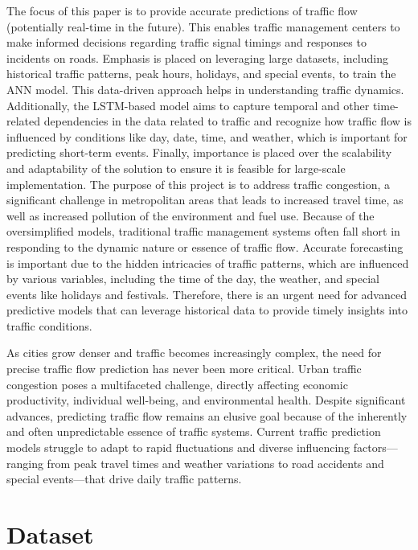 \documentclass[conference]{IEEEtran}
\begin{document}
The focus of this paper is to provide accurate predictions of traffic flow (potentially real-time in the future). This enables traffic management centers to make informed decisions regarding traffic signal timings and responses to incidents on roads. Emphasis is placed on leveraging large datasets, including historical traffic patterns, peak hours, holidays, and special events, to train the ANN model. This data-driven approach helps in understanding traffic dynamics. Additionally, the LSTM-based model aims to capture temporal and other time-related dependencies in the data related to traffic and recognize how traffic flow is influenced by conditions like day, date, time, and weather, which is important for predicting short-term events. Finally, importance is placed over the scalability and adaptability of the solution to ensure it is feasible for large-scale implementation. The purpose of this project is to address traffic congestion, a significant challenge in metropolitan areas that leads to increased travel time, as well as increased pollution of the environment and fuel use. Because of the oversimplified models, traditional traffic management systems often fall short in responding to the dynamic nature or essence of traffic flow. Accurate forecasting is important due to the hidden intricacies of traffic patterns, which are influenced by various variables, including the time of the day, the weather, and special events like holidays and festivals. Therefore, there is an urgent need for advanced predictive models that can leverage historical data to provide timely insights into traffic conditions.

As cities grow denser and traffic becomes increasingly complex, the need for precise traffic flow prediction has never been more critical. Urban traffic congestion poses a multifaceted challenge, directly affecting economic productivity, individual well-being, and environmental health. Despite significant advances, predicting traffic flow remains an elusive goal because of the inherently and often unpredictable essence of traffic systems. Current traffic prediction models struggle to adapt to rapid fluctuations and diverse influencing factors—ranging from peak travel times and weather variations to road accidents and special events—that drive daily traffic patterns.



\section{Dataset}
\end{document}
